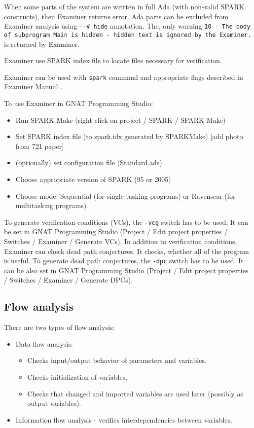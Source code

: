 When some parts of the system are written in full Ada (with non-valid SPARK constructs), then Examiner returns error. Ada parts can be excluded from Examiner analysis using \lstinline{--# hide} annotation. The, only warning \lstinline{10 - The body of subprogram Main is hidden - hidden text is ignored by the Examiner.} is returned by Examiner.

Examiner use SPARK index file to locate files necessary for verification. \cite{Barnes:Book}

Examiner can be used with \lstinline{spark} command and appropriate flags described in Examiner Manual \cite{Examiner:Online}.

To use Examiner in GNAT Programming Studio:
\begin{itemize}
	\item Run SPARK Make (right click on project / SPARK / SPARK Make)
	\item Set SPARK index file (to spark.idx generated by SPARKMake) [add photo from 721 paper]
	\item (optionally) set configuration file (Standard.ads)
	\item Choose appropriate version of SPARK (95 or 2005)
	\item Choose mode: Sequential (for single tasking programs) or Ravenscar (for multitasking programs)
\end{itemize}

To generate verification conditions (VCs), the \lstinline{-vcg} switch has to be used. It can be set in GNAT Programming Studio (Project / Edit project properties / Switches / Examiner / Generate VCs).
In addition to verification conditions, Examiner can check dead path conjectures. It checks, whether all of the program is useful. To generate dead path conjectures, the \lstinline{-dpc} switch has to be used. It can be also set in GNAT Programming Studio (Project / Edit project properties / Switches / Examiner / Generate DPCs).


\subsection{Flow analysis}
\label{verification:examiner:flowanalysis}
There are two types of flow analysis:
\begin{itemize}
	\item Data flow analysis:
	\begin{itemize}
		\item Checks input/output behavior of parameters and variables.
		\item Checks initialization of variables.
		\item Checks that changed and imported variables are used later (possibly as output variables).
	\end{itemize}
	\item Information flow analysis - verifies interdependencies between variables.
\end{itemize}

